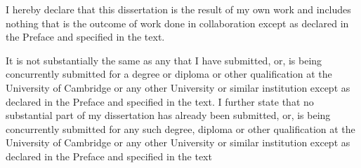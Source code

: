 
\begin{declaration}



I hereby declare that this dissertation is the result of my own work and includes nothing that is the outcome of work done in collaboration except as declared in the Preface and specified in the text.

It is not substantially the same as any that I have submitted, or, is being concurrently submitted for a degree or diploma or other qualification at the University of Cambridge or any other University or similar institution except as declared in the Preface and specified in the text. I further state that no substantial part of my dissertation has already been submitted, or, is being concurrently submitted for any such degree, diploma or other qualification at the University of Cambridge or any other University or similar institution except as declared in the Preface and specified in the text


\end{declaration}

